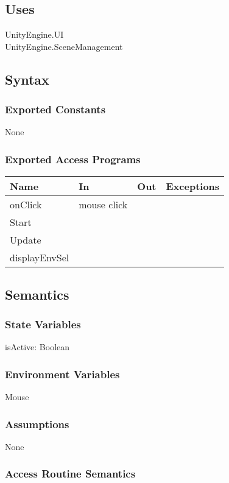 \documentclass[12pt, titlepage]{article}
\begin{document}
\subsection{Uses}
UnityEngine.UI\\
UnityEngine.SceneManagement\\

\subsection{Syntax}

\subsubsection{Exported Constants}
None
\subsubsection{Exported Access Programs}

\begin{center}
\begin{tabular}{| l | l | l | p{5cm}|}
\hline
\textbf{Name} & \textbf{In} & \textbf{Out} & \textbf{Exceptions} \\
\hline
onClick & mouse click &  &  \\
\hline
Start &&&\\
\hline
Update &&&\\
\hline
displayEnvSel &&&\\
\hline
\end{tabular}
\end{center}

\subsection{Semantics}

\subsubsection{State Variables}
isActive: Boolean

\subsubsection{Environment Variables}
Mouse
\subsubsection{Assumptions}
None
\subsubsection{Access Routine Semantics}
\end{document}
